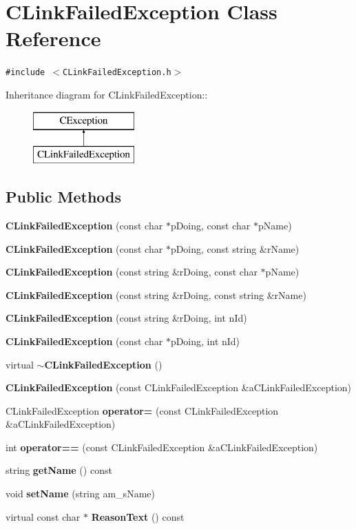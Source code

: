 \section{CLink\-Failed\-Exception  Class Reference}
\label{classCLinkFailedException}
{\tt \#include $<$CLink\-Failed\-Exception.h$>$}

Inheritance diagram for CLink\-Failed\-Exception::\begin{figure}[H]
\begin{center}
\leavevmode
\includegraphics[height=2cm]{classCLinkFailedException}
\end{center}
\end{figure}
\subsection*{Public Methods}
\begin{CompactItemize}
\item 
{\bf CLink\-Failed\-Exception} (const char $\ast$p\-Doing, const char $\ast$p\-Name)
\item 
{\bf CLink\-Failed\-Exception} (const char $\ast$p\-Doing, const string \&r\-Name)
\item 
{\bf CLink\-Failed\-Exception} (const string \&r\-Doing, const char $\ast$p\-Name)
\item 
{\bf CLink\-Failed\-Exception} (const string \&r\-Doing, const string \&r\-Name)
\item 
{\bf CLink\-Failed\-Exception} (const string \&r\-Doing, int n\-Id)
\item 
{\bf CLink\-Failed\-Exception} (const char $\ast$p\-Doing, int n\-Id)
\item 
virtual {\bf $\sim$CLink\-Failed\-Exception} ()
\item 
{\bf CLink\-Failed\-Exception} (const CLink\-Failed\-Exception \&a\-CLink\-Failed\-Exception)
\item 
CLink\-Failed\-Exception {\bf operator=} (const CLink\-Failed\-Exception \&a\-CLink\-Failed\-Exception)
\item 
int {\bf operator==} (const CLink\-Failed\-Exception \&a\-CLink\-Failed\-Exception)
\item 
string {\bf get\-Name} () const
\item 
void {\bf set\-Name} (string am\_\-s\-Name)
\item 
virtual const char $\ast$ {\bf Reason\-Text} () const
\end{CompactItemize}
